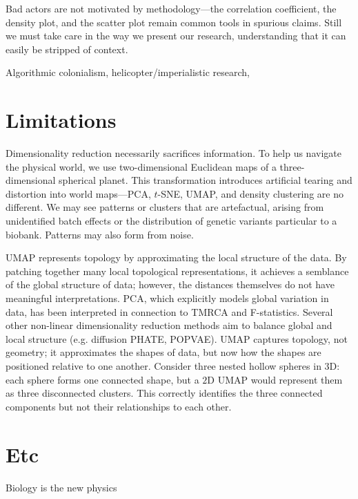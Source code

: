 Bad actors are not motivated by methodology---the correlation coefficient, the density plot, and the scatter plot remain common tools in spurious claims. Still we must take care in the way we present our research, understanding that it can easily be stripped of context.

Algorithmic colonialism, helicopter/imperialistic research, 

\citep{gebru_race_2020}



\section{Limitations}

Dimensionality reduction necessarily sacrifices information. To help us navigate the physical world, we use two-dimensional Euclidean maps of a three-dimensional spherical planet. This transformation introduces artificial tearing and distortion into world maps---PCA, $t$-SNE, UMAP, and density clustering are no different. We may see patterns or clusters that are artefactual, arising from unidentified batch effects or the distribution of genetic variants particular to a biobank. Patterns may also form from noise. 

UMAP represents topology by approximating the local structure of the data. By patching together many local topological representations, it achieves a semblance of the global structure of data; however, the distances themselves do not have meaningful interpretations. PCA, which explicitly models global variation in data, has been interpreted in connection to TMRCA and F-statistics\citep{mcvean2009genealogical,peter_geometric_2022}. Several other non-linear dimensionality reduction methods aim to balance global and local structure (e.g. diffusion PHATE\citep{moon2019visualizing}, POPVAE\citep{battey_visualizing_2021}). UMAP captures topology, not geometry; it approximates the shapes of data, but now how the shapes are positioned relative to one another. Consider three nested hollow spheres in $3$D: each sphere forms one connected shape, but a $2$D UMAP would represent them as three disconnected clusters\citep{herrmann_enhancing_2022}. This correctly identifies the three connected components but not their relationships to each other.


\section{Etc}

Biology is the new physics \citep{hunter_biology_2010}
